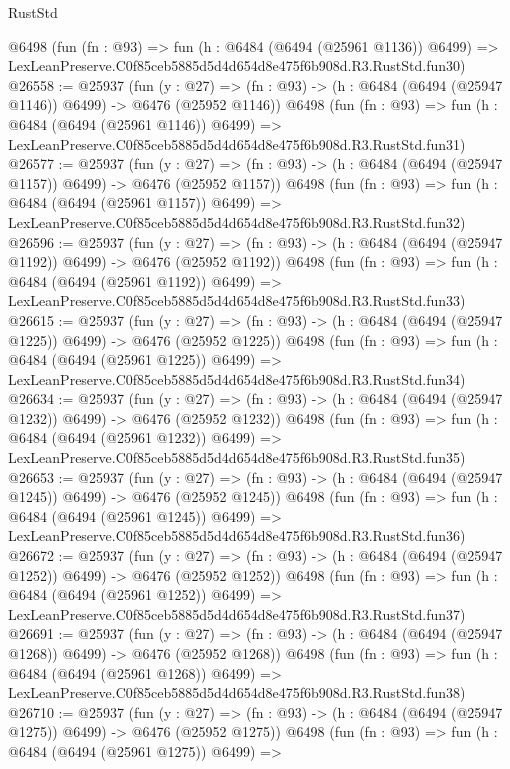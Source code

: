 \begin{lexlean}{RustStd}
\begin{coremodule}
    @6498
    (fun (fn : @93) =>
    fun (h : @6484 (@6494 (@25961 @1136)) @6499) =>
    LexLeanPreserve.C0f85ceb5885d5d4d654d8e475f6b908d.R3.RustStd.fun30)
@26558 := @25937
    (fun (y : @27) =>
    (fn : @93) -> (h : @6484 (@6494 (@25947 @1146)) @6499) -> @6476 (@25952 @1146))
    @6498
    (fun (fn : @93) =>
    fun (h : @6484 (@6494 (@25961 @1146)) @6499) =>
    LexLeanPreserve.C0f85ceb5885d5d4d654d8e475f6b908d.R3.RustStd.fun31)
@26577 := @25937
    (fun (y : @27) =>
    (fn : @93) -> (h : @6484 (@6494 (@25947 @1157)) @6499) -> @6476 (@25952 @1157))
    @6498
    (fun (fn : @93) =>
    fun (h : @6484 (@6494 (@25961 @1157)) @6499) =>
    LexLeanPreserve.C0f85ceb5885d5d4d654d8e475f6b908d.R3.RustStd.fun32)
@26596 := @25937
    (fun (y : @27) =>
    (fn : @93) -> (h : @6484 (@6494 (@25947 @1192)) @6499) -> @6476 (@25952 @1192))
    @6498
    (fun (fn : @93) =>
    fun (h : @6484 (@6494 (@25961 @1192)) @6499) =>
    LexLeanPreserve.C0f85ceb5885d5d4d654d8e475f6b908d.R3.RustStd.fun33)
@26615 := @25937
    (fun (y : @27) =>
    (fn : @93) -> (h : @6484 (@6494 (@25947 @1225)) @6499) -> @6476 (@25952 @1225))
    @6498
    (fun (fn : @93) =>
    fun (h : @6484 (@6494 (@25961 @1225)) @6499) =>
    LexLeanPreserve.C0f85ceb5885d5d4d654d8e475f6b908d.R3.RustStd.fun34)
@26634 := @25937
    (fun (y : @27) =>
    (fn : @93) -> (h : @6484 (@6494 (@25947 @1232)) @6499) -> @6476 (@25952 @1232))
    @6498
    (fun (fn : @93) =>
    fun (h : @6484 (@6494 (@25961 @1232)) @6499) =>
    LexLeanPreserve.C0f85ceb5885d5d4d654d8e475f6b908d.R3.RustStd.fun35)
@26653 := @25937
    (fun (y : @27) =>
    (fn : @93) -> (h : @6484 (@6494 (@25947 @1245)) @6499) -> @6476 (@25952 @1245))
    @6498
    (fun (fn : @93) =>
    fun (h : @6484 (@6494 (@25961 @1245)) @6499) =>
    LexLeanPreserve.C0f85ceb5885d5d4d654d8e475f6b908d.R3.RustStd.fun36)
@26672 := @25937
    (fun (y : @27) =>
    (fn : @93) -> (h : @6484 (@6494 (@25947 @1252)) @6499) -> @6476 (@25952 @1252))
    @6498
    (fun (fn : @93) =>
    fun (h : @6484 (@6494 (@25961 @1252)) @6499) =>
    LexLeanPreserve.C0f85ceb5885d5d4d654d8e475f6b908d.R3.RustStd.fun37)
@26691 := @25937
    (fun (y : @27) =>
    (fn : @93) -> (h : @6484 (@6494 (@25947 @1268)) @6499) -> @6476 (@25952 @1268))
    @6498
    (fun (fn : @93) =>
    fun (h : @6484 (@6494 (@25961 @1268)) @6499) =>
    LexLeanPreserve.C0f85ceb5885d5d4d654d8e475f6b908d.R3.RustStd.fun38)
@26710 := @25937
    (fun (y : @27) =>
    (fn : @93) -> (h : @6484 (@6494 (@25947 @1275)) @6499) -> @6476 (@25952 @1275))
    @6498
    (fun (fn : @93) =>
    fun (h : @6484 (@6494 (@25961 @1275)) @6499) =>

\end{coremodule}
\end{lexlean}
